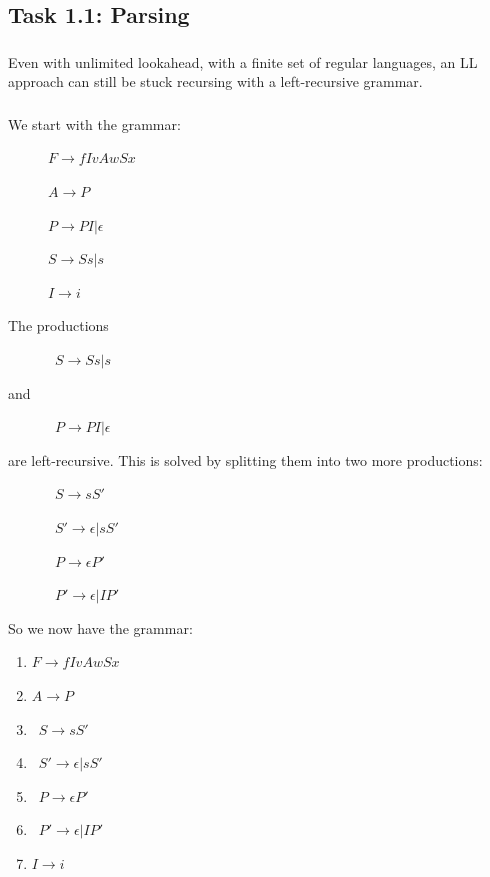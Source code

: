 \addtocounter{section}{1}
\subsection{Task 1.1: Parsing}

\subsubsection{}
Even with unlimited lookahead, with a finite set of regular languages, an LL approach can still be stuck recursing with a left-recursive grammar.

\subsubsection{}
We start with the grammar:
\begin{description}
 \item[] $F \rightarrow f I v A w S x$
 \item[] $A \rightarrow P$
 \item[] $P \rightarrow P I | \epsilon$
 \item[] $S \rightarrow S s | s$
 \item[] $I \rightarrow i$
\end{description}
The productions
\begin{description}
 \item[] $S \rightarrow S s | s$
\end{description}
and
\begin{description}
 \item[] $P \rightarrow P I | \epsilon$
\end{description}
are left-recursive.
This is solved by splitting them into two more productions:
\begin{description}
 \item[] $S \rightarrow sS'$
 \item[] $S'\rightarrow \epsilon | s S'$
 \item[] $P \rightarrow \epsilon P'$
 \item[] $P'\rightarrow \epsilon | I P'$
\end{description}
So we now have the grammar:
\begin{enumerate}
 \item $F  \rightarrow f I v A w S x$
 \item $A  \rightarrow P$
 \item $S  \rightarrow sS'$
 \item $S' \rightarrow \epsilon | s S'$
 \item $P  \rightarrow \epsilon P'$
 \item $P' \rightarrow \epsilon | I P'$
 \item $I  \rightarrow i$
\end{enumerate}

